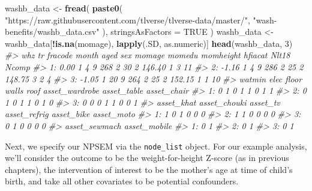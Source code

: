 \documentclass[12pt, krantz2,]{book}
\newenvironment{Shaded}{\begin{snugshade}}{\end{snugshade}}
\newcommand{\CommentTok}[1]{\textcolor[rgb]{0.56,0.35,0.01}{\textit{#1}}}
\newcommand{\DataTypeTok}[1]{\textcolor[rgb]{0.13,0.29,0.53}{#1}}
\newcommand{\DecValTok}[1]{\textcolor[rgb]{0.00,0.00,0.81}{#1}}
\newcommand{\KeywordTok}[1]{\textcolor[rgb]{0.13,0.29,0.53}{\textbf{#1}}}
\newcommand{\NormalTok}[1]{#1}
\newcommand{\OperatorTok}[1]{\textcolor[rgb]{0.81,0.36,0.00}{\textbf{#1}}}
\newcommand{\OtherTok}[1]{\textcolor[rgb]{0.56,0.35,0.01}{#1}}
\newcommand{\StringTok}[1]{\textcolor[rgb]{0.31,0.60,0.02}{#1}}
\theoremstyle{definition}
\theoremstyle{definition}
\theoremstyle{definition}
\newcommand{\1}{\mathbbm{1}}
\begin{document}
\begin{Shaded}
\begin{Highlighting}[]
\NormalTok{washb_data <-}\StringTok{ }\KeywordTok{fread}\NormalTok{(}
  \KeywordTok{paste0}\NormalTok{(}
    \StringTok{"https://raw.githubusercontent.com/tlverse/tlverse-data/master/"}\NormalTok{,}
    \StringTok{"wash-benefits/washb_data.csv"}
\NormalTok{  ),}
  \DataTypeTok{stringsAsFactors =} \OtherTok{TRUE}
\NormalTok{)}
\NormalTok{washb_data <-}\StringTok{ }\NormalTok{washb_data[}\OperatorTok{!}\KeywordTok{is.na}\NormalTok{(momage), }\KeywordTok{lapply}\NormalTok{(.SD, as.numeric)]}
\KeywordTok{head}\NormalTok{(washb_data, }\DecValTok{3}\NormalTok{)}
\CommentTok{#>      whz tr fracode month aged sex momage momedu momheight hfiacat Nlt18 Ncomp}
\CommentTok{#> 1:  0.00  1       4     9  268   2     30      2    146.40       1     3    11}
\CommentTok{#> 2: -1.16  1       4     9  286   2     25      2    148.75       3     2     4}
\CommentTok{#> 3: -1.05  1      20     9  264   2     25      2    152.15       1     1    10}
\CommentTok{#>    watmin elec floor walls roof asset_wardrobe asset_table asset_chair}
\CommentTok{#> 1:      0    1     0     1    1              0           1           1}
\CommentTok{#> 2:      0    1     0     1    1              0           1           0}
\CommentTok{#> 3:      0    0     0     1    1              0           0           1}
\CommentTok{#>    asset_khat asset_chouki asset_tv asset_refrig asset_bike asset_moto}
\CommentTok{#> 1:          1            0        1            0          0          0}
\CommentTok{#> 2:          1            1        0            0          0          0}
\CommentTok{#> 3:          0            1        0            0          0          0}
\CommentTok{#>    asset_sewmach asset_mobile}
\CommentTok{#> 1:             0            1}
\CommentTok{#> 2:             0            1}
\CommentTok{#> 3:             0            1}
\end{Highlighting}
\end{Shaded}

Next, we specify our NPSEM via the \texttt{node\_list} object. For our example analysis,
we'll consider the outcome to be the weight-for-height Z-score (as in previous
chapters), the intervention of interest to be the mother's age at time of
child's birth, and take all other covariates to be potential confounders.

\begin{Shaded}
\end{Shaded}
\end{document}
